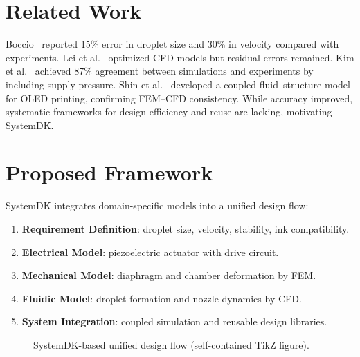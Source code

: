 \documentclass[conference]{IEEEtran}
\begin{document}
\section{Related Work}
Boccio~\cite{boccio2003} reported \mbox{15\%} error in droplet size and \mbox{30\%} in velocity compared with experiments. Lei et al.~\cite{lei2012} optimized CFD models but residual errors remained. Kim et al.~\cite{kim2022} achieved \mbox{87\%} agreement between simulations and experiments by including supply pressure. Shin et al.~\cite{shin2025} developed a coupled fluid--structure model for OLED printing, confirming FEM--CFD consistency. While accuracy improved, systematic frameworks for design efficiency and reuse are lacking, motivating SystemDK.

\section{Proposed Framework}
SystemDK integrates domain-specific models into a unified design flow:
\begin{enumerate}
  \item \textbf{Requirement Definition}: droplet size, velocity, stability, ink compatibility.
  \item \textbf{Electrical Model}: piezoelectric actuator with drive circuit.
  \item \textbf{Mechanical Model}: diaphragm and chamber deformation by FEM.
  \item \textbf{Fluidic Model}: droplet formation and nozzle dynamics by CFD.
  \item \textbf{System Integration}: coupled simulation and reusable design libraries.
\end{enumerate}

\begin{figure}[t]
\centering
{}
\caption{SystemDK-based unified design flow (self-contained TikZ figure).}
\label{fig:flow}
\end{figure}
\end{document}
